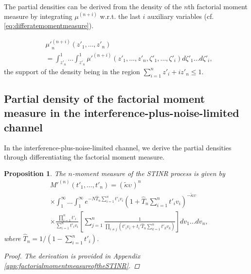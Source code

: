 \documentclass[lettersize,journal]{IEEEtran}
\newtheorem{prop}[theorem]{Proposition}
\begin{document}
The partial densities can be derived from the density of the $n$th factorial moment measure by integrating $\mu^{(n+i)}$ w.r.t. the last $i$ auxiliary variables (cf. \eqref{eq:differatemomentmeasure}).

\begin{align}
  \label{eq:auxillary}
  &{\mu'}_n^{(n+i)}(z'_1,\dots,z'_n) \nonumber \\
  &= \int_{z'_n}^1 \dots \int_{z'_n}^1 {\mu'}^{(n+i)}(z'_1,\dots,z'_n,\zeta'_1,\dots,\zeta'_i) d\zeta'_1 \dots d\zeta'_i,
\end{align}
the support of the density being in the region $\sum_{i=1}^nz'_i+iz'_n \leq 1$. 








\subsection{Partial density of the factorial moment measure in the interference-plus-noise-limited channel}


In the interference-plus-noise-limited channel, we derive the partial densities through differentiating the factorial moment measure.

\begin{prop}
  The $n$-moment measure of the STINR process is given by
  \begin{align}
    \label{eq:nthmomentmeasureSTINR}
      &M'^{(n)}(t'_1,\dots,t'_n) =\left(\tilde{\kappa} \upsilon_{}\right)^n \nonumber\\
      &\times \int_1^{\infty}\dots\int_1^{\infty} e^{-N\hat{T}_n\sum\limits_{i=1}^nt'_iv_i} \left(1+\hat{T}_n\sum\limits_{i=1}^nt'_iv_i\right)^{-\tilde{\kappa}\upsilon_{}} \nonumber\\
      &\times \frac{\prod\limits_{i=1}^nt'_i}{\sum\limits_{i=1}^nt'_iv_i}  \left[\sum\limits_{j=1}^n\frac{1}{\prod\limits_{i\neq j}\left(t'_i v_i+ t_i'\hat{T}_n\sum\limits_{k=1}^nt'_kv_k \right)} \right] dv_1 \dots dv_n,
    \end{align}
    where $\hat{T}_n= 1/(1-\sum_{i=1}^nt'_i)$.

    \begin{proof}
      The derivation is provided in Appendix \ref{app:factorialmomentmeasureoftheSTINR}.
    \end{proof}

\end{prop}
 
\end{document}

